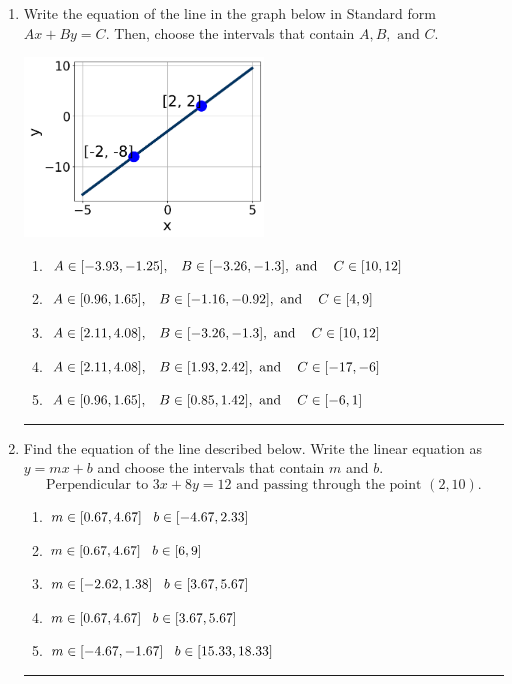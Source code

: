 \documentclass[14pt]{extbook}
\newcommand{\litem}[1]{\item#1\hspace*{-1cm}\rule{\textwidth}{0.4pt}}
\begin{document}
\begin{enumerate}
{\begin{enumerate}[label=\Alph*.]
\end{enumerate} }
\litem{
Write the equation of the line in the graph below in Standard form $Ax+By=C$. Then, choose the intervals that contain $A, B, \text{ and } C$.
\begin{center}
    \includegraphics[width=0.5\textwidth]{../Figures/linearGraphToStandardCopyA.png}
\end{center}
\begin{enumerate}[label=\Alph*.]
\item \( A \in [-3.93, -1.25], \hspace{3mm} B \in [-3.26, -1.3], \text{ and } \hspace{3mm} C \in [10, 12] \)
\item \( A \in [0.96, 1.65], \hspace{3mm} B \in [-1.16, -0.92], \text{ and } \hspace{3mm} C \in [4, 9] \)
\item \( A \in [2.11, 4.08], \hspace{3mm} B \in [-3.26, -1.3], \text{ and } \hspace{3mm} C \in [10, 12] \)
\item \( A \in [2.11, 4.08], \hspace{3mm} B \in [1.93, 2.42], \text{ and } \hspace{3mm} C \in [-17, -6] \)
\item \( A \in [0.96, 1.65], \hspace{3mm} B \in [0.85, 1.42], \text{ and } \hspace{3mm} C \in [-6, 1] \)

\end{enumerate} }
\litem{
Find the equation of the line described below. Write the linear equation as $ y=mx+b $ and choose the intervals that contain $m$ and $b$.\[ \text{Perpendicular to } 3 x + 8 y = 12 \text{ and passing through the point } (2, 10). \]\begin{enumerate}[label=\Alph*.]
\item \( m \in [0.67, 4.67] \hspace*{3mm} b \in [-4.67, 2.33] \)
\item \( m \in [0.67, 4.67] \hspace*{3mm} b \in [6, 9] \)
\item \( m \in [-2.62, 1.38] \hspace*{3mm} b \in [3.67, 5.67] \)
\item \( m \in [0.67, 4.67] \hspace*{3mm} b \in [3.67, 5.67] \)
\item \( m \in [-4.67, -1.67] \hspace*{3mm} b \in [15.33, 18.33] \)


\end{enumerate}}
\end{enumerate}
\end{document}
